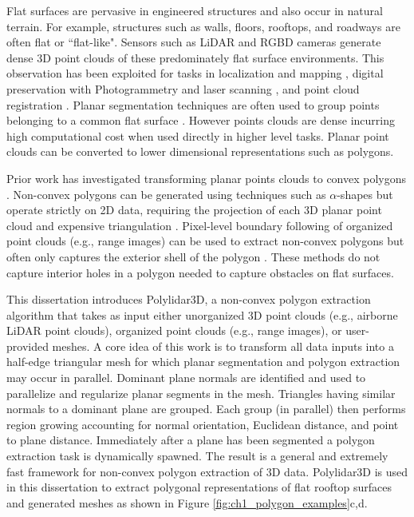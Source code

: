 Flat surfaces are pervasive in engineered structures and also occur in natural terrain. For example, structures such as walls, floors, rooftops, and roadways are often flat or ``flat-like". 
Sensors such as LiDAR and RGBD cameras generate dense 3D point clouds of these predominately flat surface environments. This observation has been exploited for tasks in localization and mapping \cite{pathak_online_2010},  digital preservation with Photogrammetry and laser scanning \cite{malihi_3d_2016, lerma_terrestrial_2010, balsa-barreiro_generation_2018}, and point cloud registration \cite{rusinkiewicz_efficient_2001}. Planar segmentation techniques are often used to group points belonging to a common flat surface \cite{feng_fast_2014, pham_geometrically_2016-1, schaefer_maximum_2019}. However points clouds are dense incurring high computational cost when used directly in higher level tasks. Planar point clouds can be converted to lower dimensional representations such as polygons.

Prior work has investigated transforming planar points clouds to convex polygons \cite{biswas_planar_2012,poppinga_fast_2008}.  Non-convex polygons can be generated using techniques such as $\alpha$-shapes but operate strictly on 2D data, requiring the projection of each 3D planar point cloud and expensive triangulation \cite{lee_fast_2013, edelsbrunner_shape_1983}. Pixel-level boundary following of organized point clouds (e.g., range images) can be used to extract non-convex polygons but often only captures the exterior shell of the polygon \cite{lee_indoor_2012-1}. These methods do not capture interior holes in a polygon needed to capture obstacles on flat surfaces. 


This dissertation introduces Polylidar3D, a non-convex polygon extraction algorithm that takes as input either unorganized 3D point clouds (e.g., airborne LiDAR point clouds), organized point clouds (e.g., range images), or user-provided meshes. A core idea of this work is to transform all data inputs into a half-edge triangular mesh for which planar segmentation and polygon extraction may occur in parallel. Dominant plane normals are identified and used to parallelize and regularize planar segments in the mesh. Triangles having similar normals to a dominant plane are grouped. Each group (in parallel) then performs region growing accounting for normal orientation, Euclidean distance, and point to plane distance. Immediately after a plane has been segmented a polygon extraction task is dynamically spawned. The result is a general and extremely fast framework for non-convex polygon extraction of 3D data. Polylidar3D is used in this dissertation to extract polygonal representations of flat rooftop surfaces and generated meshes as shown in Figure \ref{fig:ch1_polygon_examples}c,d.



